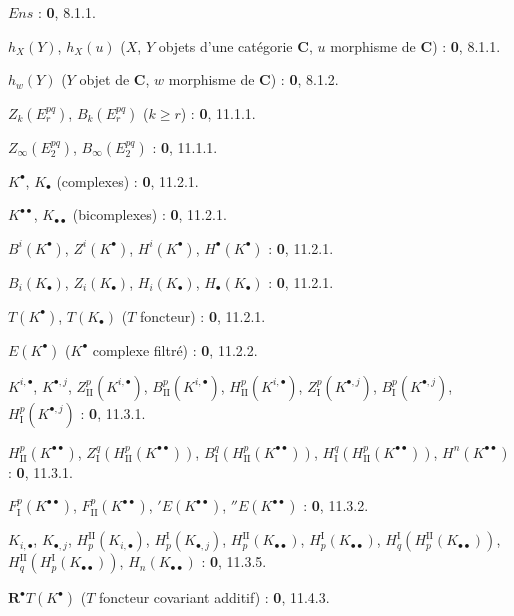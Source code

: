 \begin{flushleft}
$\boldsymbol{\mathit{Ens}}$ : \textbf{0}, 8.1.1.

$h_X(Y)$, $h_X(u)$ ($X$, $Y$ objets d'une catégorie $\boldsymbol{C}$, $u$ morphisme de
$\boldsymbol{C}$) : \textbf{0}, 8.1.1.

$h_w(Y)$ ($Y$ objet de $\boldsymbol{C}$, $w$ morphisme de $\boldsymbol{C}$) : \textbf{0}, 8.1.2.

$Z_k(E_r^{pq})$, $B_k(E_r^{pq})$ ($k\geq r$) : \textbf{0}, 11.1.1.

$Z_\infty(E_2^{pq})$, $B_\infty(E_2^{pq})$ : \textbf{0}, 11.1.1.

$K^\bullet$, $K_\bullet$ (complexes) : \textbf{0}, 11.2.1.

$K^{\bullet\bullet}$, $K_{\bullet\bullet}$ (bicomplexes) : \textbf{0}, 11.2.1.

$B^i(K^\bullet)$, $Z^i(K^\bullet)$, $H^i(K^\bullet)$,
$H^\bullet(K^\bullet)$ : \textbf{0}, 11.2.1.

$B_i(K_\bullet)$, $Z_i(K_\bullet)$, $H_i(K_\bullet)$,
$H_\bullet(K_\bullet)$ : \textbf{0}, 11.2.1.

$T(K^\bullet)$, $T(K_\bullet)$ ($T$ foncteur) : \textbf{0}, 11.2.1.

$E(K^\bullet)$ ($K^\bullet$ complexe filtré) : \textbf{0}, 11.2.2.

$K^{i,\bullet}$, $K^{\bullet,j}$, $Z_{\mathrm{II}}^p(K^{i,\bullet})$,
$B_{\mathrm{II}}^p(K^{i,\bullet})$, $H_{\mathrm{II}}^p(K^{i,\bullet})$,
$Z_{\mathrm I}^p(K^{\bullet,j})$, $B_{\mathrm I}^p(K^{\bullet,j})$,
$H_{\mathrm I}^p(K^{\bullet,j})$ : \textbf{0}, 11.3.1.

$H_{\mathrm{II}}^p(K^{\bullet\bullet})$,
$Z_{\mathrm I}^q(H_{\mathrm{II}}^p(K^{\bullet\bullet}))$,
$B_{\mathrm I}^q(H_{\mathrm{II}}^p(K^{\bullet\bullet}))$,
$H_{\mathrm I}^q(H_{\mathrm{II}}^p(K^{\bullet\bullet}))$,
$H^n(K^{\bullet\bullet})$ : \textbf{0}, 11.3.1.

$F_{\mathrm I}^p(K^{\bullet\bullet})$,
$F_{\mathrm{II}}^p(K^{\bullet\bullet})$, ${}'E(K^{\bullet\bullet})$,
${}''E(K^{\bullet\bullet})$ : \textbf{0}, 11.3.2.

$K_{i,\bullet}$, $K_{\bullet,j}$, $H_p^{\mathrm{II}}(K_{i,\bullet})$,
$H_p^{\mathrm I}(K_{\bullet,j})$, $H_p^{\mathrm{II}}(K_{\bullet\bullet})$,
$H_p^{\mathrm I}(K_{\bullet\bullet})$,
$H_q^{\mathrm I}(H_p^{\mathrm{II}}(K_{\bullet\bullet}))$,
$H_q^{\mathrm{II}}(H_p^{\mathrm I}(K_{\bullet\bullet}))$,
$H_n(K_{\bullet\bullet})$ : \textbf{0}, 11.3.5.

$\mathbf R^\bullet T(K^\bullet)$ ($T$ foncteur covariant additif) : \textbf{0}, 11.4.3.


\end{flushleft}
